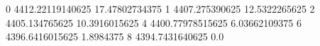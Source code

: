 0 4412.22119140625 17.47802734375
1 4407.275390625 12.5322265625
2 4405.134765625 10.3916015625
4 4400.77978515625 6.03662109375
6 4396.6416015625 1.8984375
8 4394.7431640625 0.0
